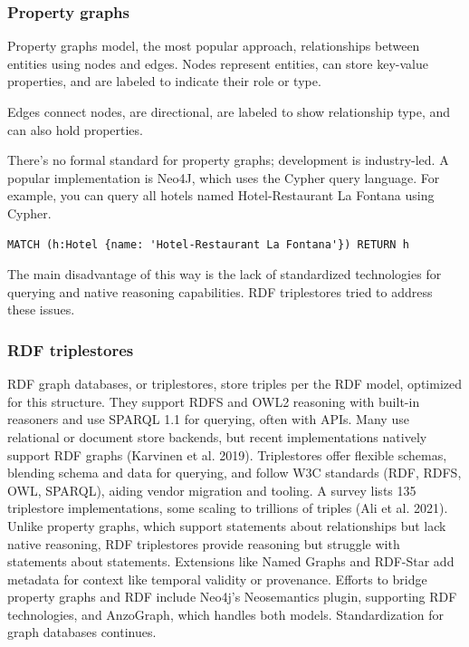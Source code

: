 \documentclass[12pt]{article}
\begin{document}
\subsubsection{Property graphs}
Property graphs model, the most popular approach, relationships between entities using nodes and edges.
Nodes represent entities, can store key-value properties, and are labeled to indicate their role or type.

Edges connect nodes, are directional, are labeled to show relationship type, and can also hold properties.

There’s no formal standard for property graphs; development is industry-led. A popular implementation is Neo4J, which uses the Cypher query language. For example, you can query all hotels named Hotel-Restaurant La Fontana using Cypher.
\begin{verbatim}
MATCH (h:Hotel {name: 'Hotel-Restaurant La Fontana'}) RETURN h
\end{verbatim}
The main disadvantage of this way is the lack of standardized technologies for querying and native reasoning capabilities. RDF triplestores tried to address these issues.
\subsubsection{RDF triplestores}
RDF graph databases, or triplestores, store triples per the RDF model, optimized for this structure. They support RDFS and OWL2 reasoning with built-in reasoners and use SPARQL 1.1 for querying, often with APIs. Many use relational or document store backends, but recent implementations natively support RDF graphs (Karvinen et al. 2019). Triplestores offer flexible schemas, blending schema and data for querying, and follow W3C standards (RDF, RDFS, OWL, SPARQL), aiding vendor migration and tooling. A survey lists 135 triplestore implementations, some scaling to trillions of triples (Ali et al. 2021). Unlike property graphs, which support statements about relationships but lack native reasoning, RDF triplestores provide reasoning but struggle with statements about statements. Extensions like Named Graphs and RDF-Star add metadata for context like temporal validity or provenance. Efforts to bridge property graphs and RDF include Neo4j's Neosemantics plugin, supporting RDF technologies, and AnzoGraph, which handles both models. Standardization for graph databases continues.
\end{document}
